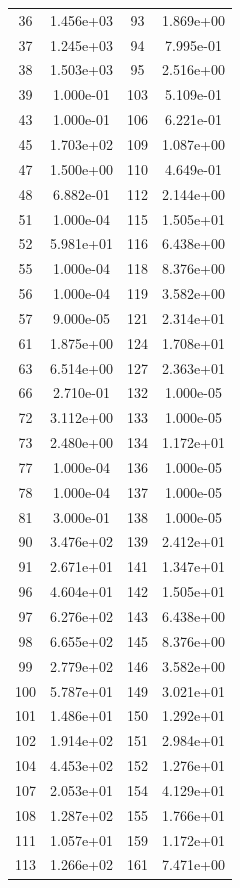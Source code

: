 \documentclass[12pt]{article}
\begin{document}
\begin{longtable}{@{}cccc@{}}
36 & 1.456e+03 & 93 & 1.869e+00 \\
37 & 1.245e+03 & 94 & 7.995e-01 \\
38 & 1.503e+03 & 95 & 2.516e+00 \\
39 & 1.000e-01 & 103 & 5.109e-01 \\
43 & 1.000e-01 & 106 & 6.221e-01 \\
45 & 1.703e+02 & 109 & 1.087e+00 \\
47 & 1.500e+00 & 110 & 4.649e-01 \\
48 & 6.882e-01 & 112 & 2.144e+00 \\
51 & 1.000e-04 & 115 & 1.505e+01 \\
52 & 5.981e+01 & 116 & 6.438e+00 \\
55 & 1.000e-04 & 118 & 8.376e+00 \\
56 & 1.000e-04 & 119 & 3.582e+00 \\
57 & 9.000e-05 & 121 & 2.314e+01 \\
61 & 1.875e+00 & 124 & 1.708e+01 \\
63 & 6.514e+00 & 127 & 2.363e+01 \\
66 & 2.710e-01 & 132 & 1.000e-05 \\
72 & 3.112e+00 & 133 & 1.000e-05 \\
73 & 2.480e+00 & 134 & 1.172e+01 \\
77 & 1.000e-04 & 136 & 1.000e-05 \\
78 & 1.000e-04 & 137 & 1.000e-05 \\
81 & 3.000e-01 & 138 & 1.000e-05 \\
90 & 3.476e+02 & 139 & 2.412e+01 \\
91 & 2.671e+01 & 141 & 1.347e+01 \\
96 & 4.604e+01 & 142 & 1.505e+01 \\
97 & 6.276e+02 & 143 & 6.438e+00 \\
98 & 6.655e+02 & 145 & 8.376e+00 \\
99 & 2.779e+02 & 146 & 3.582e+00 \\
100 & 5.787e+01 & 149 & 3.021e+01 \\
101 & 1.486e+01 & 150 & 1.292e+01 \\
102 & 1.914e+02 & 151 & 2.984e+01 \\
104 & 4.453e+02 & 152 & 1.276e+01 \\
107 & 2.053e+01 & 154 & 4.129e+01 \\
108 & 1.287e+02 & 155 & 1.766e+01 \\
111 & 1.057e+01 & 159 & 1.172e+01 \\
113 & 1.266e+02 & 161 & 7.471e+00 \\

\end{longtable}
\end{document}
